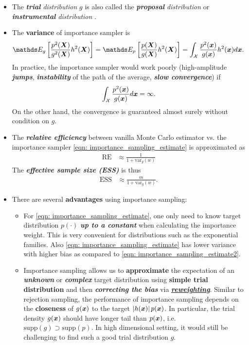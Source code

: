 \documentclass[11pt]{article}
\begin{document}
\begin{itemize}
\item The \emph{\textbf{trial} distribution} $g$ is also called the \emph{\textbf{proposal} distribution} or \emph{\textbf{instrumental} distribution} \citep{robert1999monte, liu2001monte}.

\item The \textbf{variance} of importance sampler is
\begin{align*}
\E{g}{\frac{p^2(\mb{X})}{g^2(\mb{X})}h^2(\mb{X})} &= \E{p}{\frac{p(\mb{X})}{g(\mb{X})}h^2(\mb{X})} = \int_{\cX} \frac{p^2(\mb{x})}{g(\mb{x})}h^2(\mb{x}) d\mb{x}.
\end{align*} In practice, the importance sampler would work poorly (high-amplitude \textbf{\emph{jumps}}, \emph{\textbf{instability}} of the path of the average, \emph{\textbf{slow convergence}}) if 
\begin{align*}
\int_{{\mathcal X}}\frac{p^2(\boldsymbol{x})}{g(\boldsymbol{x})} d\boldsymbol{x} = \infty.
\end{align*} On the other hand, the convergence is guaranteed almost surely without condition on $g$.

\item The \emph{\textbf{relative efficiency}} between vanilla Monte Carlo estimator vs. the importance sampler \eqref{eqn: importance_sampling_estimate} is approximated as  
\begin{align}
\text{RE} &\approx \frac{1}{1 + \text{var}_{g}(w)} \label{eqn: importance_sampling_rel_eff}
\end{align} The \emph{\textbf{effective sample size (ESS)}} is thus 
\begin{align*}
\text{ESS} & \approx \frac{m}{1 + \text{var}_{g}(w)}.
\end{align*} 

\item There are several \textbf{advantages} using importance sampling:
\begin{itemize}
\item For \eqref{eqn: importance_sampling_estimate}, one only need to know target distribution $p(\cdot)$ \emph{\textbf{up to a constant}} when calculating the importance weight. This is very convenient for distributions such as the exponential families. Also \eqref{eqn: importance_sampling_estimate} has lower variance with higher bias as compared to \eqref{eqn: importance_sampling_estimate2}.

\item Importance sampling allows us to \textbf{approximate} the expectation of an \emph{\textbf{unknown}} or  \emph{\textbf{complex}} target distribution using \textbf{simple trial distribution} and then \textbf{\emph{correcting the bias}} via \underline{\textbf{\emph{reweighting}}}. Similar to rejection sampling, the performance of importance sampling depends on the \textbf{closeness} of $g(\boldsymbol{x})$ to the target $\left\lvert h(\boldsymbol{x}) \right\rvert p(\boldsymbol{x})$. In particular, the trial density $g(\boldsymbol{x})$ should have longer tail than $p(\boldsymbol{x})$, i.e. $\text{supp}(g) \supset \text{supp}(p)$. In high dimensional setting, it would still be challenging to find such a good trial distribution $g$.
\end{itemize}
\end{itemize}
\end{document}
